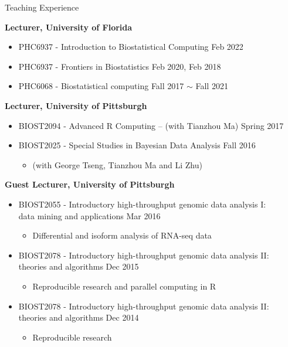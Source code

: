 \documentclass{resume} %
\begin{document}
\begin{rSection}{Teaching Experience }

\textbf{Lecturer, University of Florida}
\begin{itemize}[noitemsep,topsep=0pt]
\item PHC6937 - Introduction to Biostatistical Computing	 \hfill Feb 2022
\item PHC6937 - Frontiers in Biostatistics \hfill Feb 2020, Feb 2018
\item PHC6068 - Biostatistical computing \hfill Fall 2017 $\sim$ Fall 2021
\end{itemize}


\textbf{Lecturer, University of Pittsburgh}
\begin{itemize}[noitemsep,topsep=0pt]
\item BIOST2094 - Advanced R Computing -- (with Tianzhou Ma) \hfill Spring 2017
\item BIOST2025 - Special Studies in Bayesian Data Analysis  \hfill Fall 2016
\begin{itemize}[noitemsep,topsep=0pt]
\item{(with George Tseng, Tianzhou Ma and Li Zhu)}
\end{itemize}
\end{itemize}


\textbf{Guest Lecturer, University of Pittsburgh}
\begin{itemize}[noitemsep,topsep=0pt]
\item BIOST2055 - Introductory high-throughput genomic data analysis I: \\data mining and applications \hfill Mar 2016
\begin{itemize}[noitemsep,topsep=0pt]
\item{Differential and isoform analysis of RNA-seq data}
\end{itemize}
\item BIOST2078 - Introductory high-throughput genomic data analysis II: \\theories and algorithms  \hfill Dec 2015
\begin{itemize}[noitemsep,topsep=0pt]
\item{Reproducible research and parallel computing in R}
\end{itemize}
\item BIOST2078 - Introductory high-throughput genomic data analysis II: \\theories and algorithms  \hfill Dec 2014
\begin{itemize}[noitemsep,topsep=0pt]
\item{Reproducible research}
\end{itemize}
\end{itemize}


\end{rSection}
\end{document}
